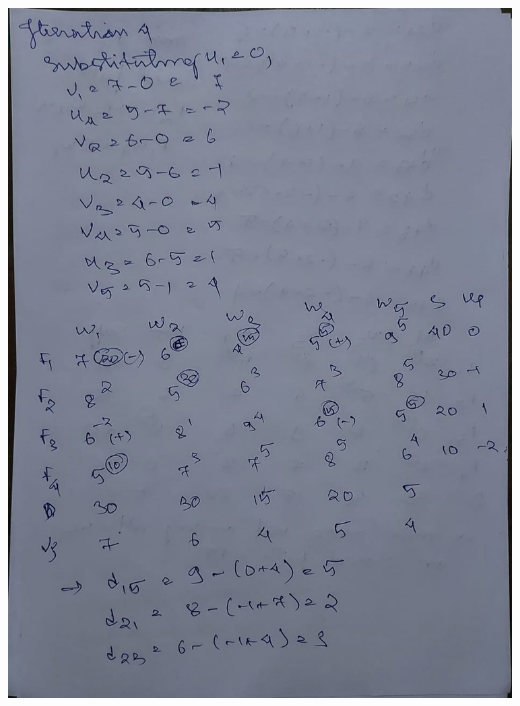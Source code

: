 \documentclass[12pt, letterpaper, twoside]{book}
\begin{document}
\includegraphics[width=\paperwidth, height=\paperheight]{Page16}
\end{document}
